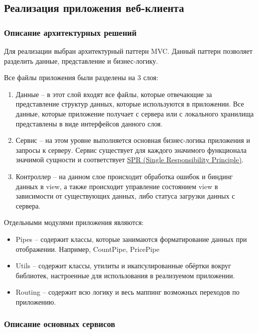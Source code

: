 \subsection{Реализация приложения веб-клиента}\label{subsec:3-impl-web}\indent

\subsubsection{Описание архитектурных решений}\indent

Для реализации выбран архитектурный паттерн MVC. Данный паттерн позволяет разделить данные, представление и бизнес-логику.

Все файлы приложения были разделены на 3 слоя:
\begin{enumerate}
    \item Данные – в этот слой входят все файлы, которые отвечающие за представление структур данных, которые используются в приложении.
    Все данные, которые приложение получает с сервера или с локального хранилища представлены в виде интерфейсов данного слоя.
    \item Сервис – на этом уровне выполняется основная бизнес-логика приложения и запросы к серверу.
    Сервис существует для каждого значимого функционала значимой сущности и соответствует \hyperlink{gloss:spr}{SPR (Single Responsibility Principle)}.
    \item Контроллер – на данном слое происходит обработка ошибок и биндинг данных в view, а также происходит управление состоянием view в зависимости от существующих данных, либо статуса загрузки данных с сервера.
\end{enumerate}

Отдельными модулями приложения являются:
\begin{itemize}
    \item Pipes – содержит классы, которые занимаются форматирование данных при отображении.
    Например, CountPipe, PricePipe
    \item Utils – содержит классы, утилиты и икапсулированные обёртки вокруг библиотек, настроенные для использования в реализуемом приложении.
    \item Routing – содержит всю логику и весь маппинг возможных переходов по приложению.
\end{itemize}

\subsubsection{Описание основных сервисов}\indent

